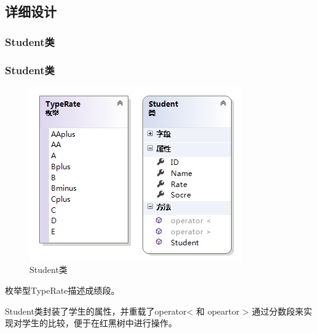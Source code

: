 \documentclass{beamer}
\begin{document}
\subsection{详细设计}
\begin{frame}
\frametitle{Student类}
\subsubsection{Student类}
\begin{figure}[H]
\centering
\includegraphics[scale = 0.4]{3.png}
\caption{Student类} 
\end{figure}
枚举型TypeRate描述成绩段。\par
Student类封装了学生的属性，并重载了operator< 和 opeartor > 通过分数段来实现对学生的比较，便于在红黑树中进行操作。
\end{frame}
\end{document}
